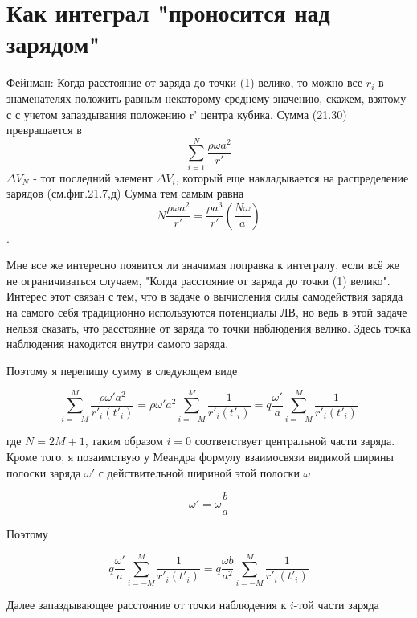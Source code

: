 \documentclass{article}
\begin{document}


\section{Как интеграл "проносится над зарядом"}

Фейнман:
Когда расстояние от заряда до точки (1) велико, то можно все $r_i$ в знаменателях положить равным некоторому среднему значению, скажем, взятому с с учетом запаздывания положению r' центра кубика. Сумма (21.30) превращается в 
$$\sum\limits_{i=1}^N \frac{\rho \omega a^2}{r'}$$
$\Delta V_N$ - тот последний элемент $\Delta V_i$, который еще накладывается на распределение зарядов (см.фиг.21.7,д)
Сумма тем самым равна
$$N\frac{\rho \omega a^2}{r'}=\frac{\rho a^3}{r'}\left (\frac{N\omega}{a}\right )$$.

Мне все же интересно появится ли значимая поправка к интегралу, если всё же не ограничиваться случаем, "Когда расстояние от заряда до точки (1) велико". Интерес этот связан с тем, что в задаче о вычисления силы самодействия заряда на самого себя традиционно используются потенциалы ЛВ, но ведь в этой задаче нельзя сказать, что расстояние от заряда то точки наблюдения велико. Здесь точка наблюдения находится внутри самого заряда.

Поэтому я перепишу сумму в следующем виде

$$\sum\limits_{i=-M}^M \frac{\rho \omega' a^2}{r'_{i}(t'_{i})}=\rho \omega' a^2\sum\limits_{i=-M}^M \frac{1}{r'_{i}(t'_{i})}=q \frac{\omega'}{a}\sum\limits_{i=-M}^M \frac{1}{r'_{i}(t'_{i})}$$

где $N=2M+1$, таким образом $i=0$ соответствует центральной части заряда. Кроме того, я позаимствую у Меандра формулу взаимосвязи видимой ширины полоски заряда  $\omega'$ с действительной шириной этой полоски  $\omega$

$$\omega' =  \omega \frac{b}{a}$$

Поэтому

$$q \frac{\omega'}{a}\sum\limits_{i=-M}^M \frac{1}{r'_{i}(t'_{i})}=q \frac{\omega b}{a^2}\sum\limits_{i=-M}^M \frac{1}{r'_{i}(t'_{i})}$$

Далее запаздывающее расстояние от точки наблюдения к $i$-той части заряда
\end{document}
